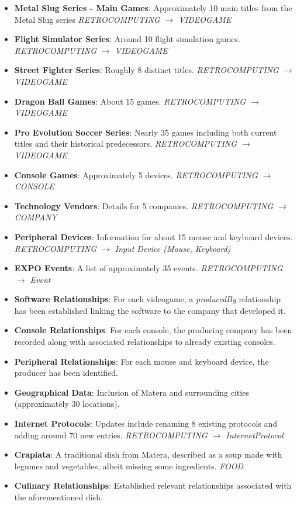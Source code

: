 \begin{itemize}
    \item \textbf{Metal Slug Series - Main Games}: Approximately 10 main titles from the Metal Slug series  \textit{RETROCOMPUTING $\rightarrow$ VIDEOGAME}
    \item \textbf{Flight Simulator Series}: Around 10 flight simulation games.  \textit{RETROCOMPUTING $\rightarrow$ VIDEOGAME}
    \item \textbf{Street Fighter Series}: Roughly 8 distinct titles.  \textit{RETROCOMPUTING $\rightarrow$ VIDEOGAME}
    \item \textbf{Dragon Ball Games}: About 15 games.  \textit{RETROCOMPUTING $\rightarrow$ VIDEOGAME}
    \item \textbf{Pro Evolution Soccer Series}: Nearly 35 games including both current titles and their historical predecessors.  \textit{RETROCOMPUTING $\rightarrow$ VIDEOGAME}
    \item \textbf{Console Games}: Approximately 5 devices.  \textit{RETROCOMPUTING $\rightarrow$ CONSOLE}
    \item \textbf{Technology Vendors}: Details for 5 companies.  \textit{RETROCOMPUTING $\rightarrow$ COMPANY}
    \item \textbf{Peripheral Devices}: Information for about 15 mouse and keyboard devices.  \textit{RETROCOMPUTING $\rightarrow$ Input Device   (Mouse, Keyboard)}
    \item \textbf{EXPO Events}: A list of approximately 35 events. \textit{RETROCOMPUTING $\rightarrow$ Event}
    \item \textbf{Software Relationships}: For each videogame, a \textit{producedBy} relationship has been established linking the software to the company that developed it.
    \item \textbf{Console Relationships}: For each console, the producing company has been recorded along with associated relationships to already existing consoles.
    \item \textbf{Peripheral Relationships}: For each mouse and keyboard device, the producer has been identified.
    \item \textbf{Geographical Data}: Inclusion of Matera and surrounding cities (approximately 30 locations).
    \item \textbf{Internet Protocols}: Updates include renaming 8 existing protocols and adding around 70 new entries.  \textit{RETROCOMPUTING $\rightarrow$ InternetProtocol}
    \item \textbf{Crapiata}: A traditional dish from Matera, described as a soup made with legumes and vegetables, albeit missing some ingredients.   \textit{FOOD}
    \item \textbf{Culinary Relationships}: Established relevant relationships associated with the aforementioned dish.
\end{itemize}

